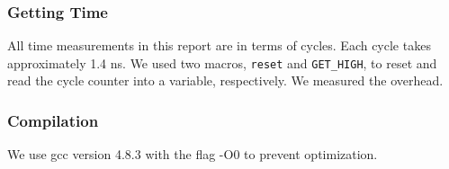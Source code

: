 \subsubsection{Getting Time}
All time measurements in this report are in terms of cycles. Each cycle takes approximately 1.4 ns. We used two macros, {\tt reset} and {\tt GET\_HIGH}, to reset and read the cycle counter into a variable, respectively. We measured the overhead.

\subsubsection{Compilation}
We use gcc version 4.8.3 with the flag -O0 to prevent optimization.
